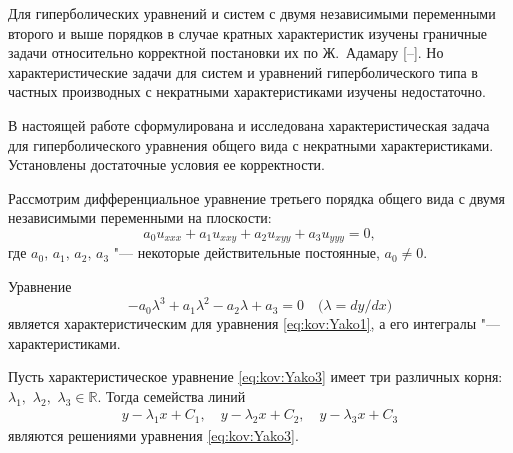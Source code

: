 
\date{04/VII/2012} %



\maketitle
\small

Для гиперболических уравнений  и систем с двумя независимыми
переменными второго и выше порядков в случае кратных характеристик
изучены граничные задачи относительно корректной постановки их по
Ж.~Адамару
[--].
Но характеристические задачи для систем и уравнений
гиперболического типа в частных производных с некратными
характеристиками изучены недостаточно.

В настоящей работе сформулирована и исследована характеристическая
задача для гиперболического уравнения общего вида с некратными
характеристиками. Установлены достаточные условия ее корректности.

\smallskip

Рассмотрим дифференциальное уравнение третьего порядка общего вида
с двумя независимыми переменными на плоскости:
\begin{equation}
a_{0}u_{xxx}+a_{1}u_{xxy}+a_{2}u_{xyy}+a_{3}u_{yyy}=0, \label{eq:kov:Yako1}
\end{equation}
где $a_{0},\,a_{1},\,a_{2},\,a_{3}$ "--- некоторые действительные
постоянные, $a_{0}\neq 0$.

Уравнение
\begin{equation}
-a_{0}\lambda^{3}+a_{1}\lambda^{2}-a_{2}\lambda+a_{3}=0\quad  \bigl(\lambda={dy}/{dx}\bigr)\label{eq:kov:Yako3}
\end{equation}
является характеристическим для уравнения \eqref{eq:kov:Yako1}, а его интегралы "--- характеристиками.

Пусть характеристическое уравнение \eqref{eq:kov:Yako3} имеет три
различных корня: 
$\lambda_{1},$ $\lambda_{2},$ $\lambda_{3}\in\mathbb{R}$. Тогда
семейства линий
\begin{gather*}
y-\lambda_{1}x+C_{1},
\quad  y-\lambda_{2}x+C_{2},
\quad  y-\lambda_{3}x+C_{3}
\end{gather*}
являются решениями уравнения \eqref{eq:kov:Yako3}.

